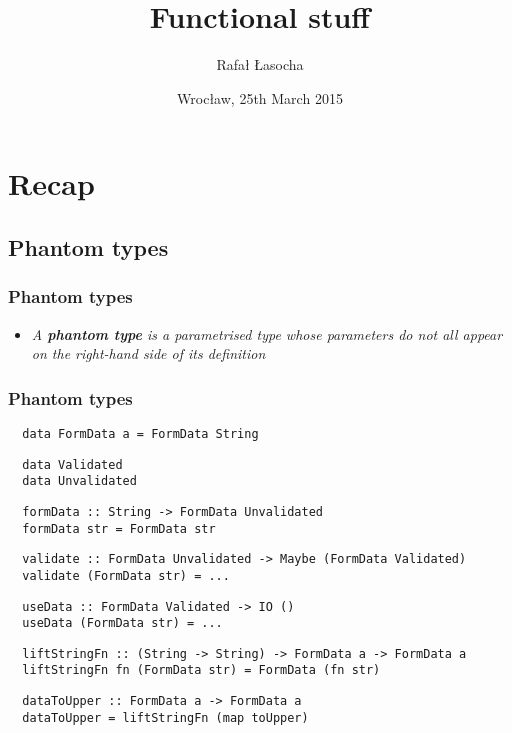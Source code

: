 \documentclass[aspectratio=43]{beamer}
\title{Functional stuff}
\author{Rafał Łasocha}
\date{Wrocław, 25th March 2015}
\begin{document}
  

\frame{\titlepage}


\section{Recap}

\subsection{Phantom types}

\begin{frame}[fragile]
 \frametitle{Phantom types}
 \begin{itemize}
  \item \textit{A \textbf{phantom type} is a parametrised type whose parameters do not all appear on the right-hand side of its definition}
 \end{itemize}
\end{frame}

\begin{frame}[fragile]
 \frametitle{Phantom types}
 \begin{lstlisting}
  data FormData a = FormData String
 \end{lstlisting}
 \pause
 \begin{lstlisting}
  data Validated
  data Unvalidated
 \end{lstlisting}
 \pause
 \begin{lstlisting}
  formData :: String -> FormData Unvalidated
  formData str = FormData str
 \end{lstlisting}
 \pause
 \begin{lstlisting}
  validate :: FormData Unvalidated -> Maybe (FormData Validated)
  validate (FormData str) = ...
 \end{lstlisting}
 \pause
 \begin{lstlisting}
  useData :: FormData Validated -> IO ()
  useData (FormData str) = ...
 \end{lstlisting}
 \pause
 \begin{lstlisting}
  liftStringFn :: (String -> String) -> FormData a -> FormData a
  liftStringFn fn (FormData str) = FormData (fn str)
 \end{lstlisting}
 \pause
 \begin{lstlisting}
  dataToUpper :: FormData a -> FormData a
  dataToUpper = liftStringFn (map toUpper)
 \end{lstlisting}
\end{frame}
\end{document}
